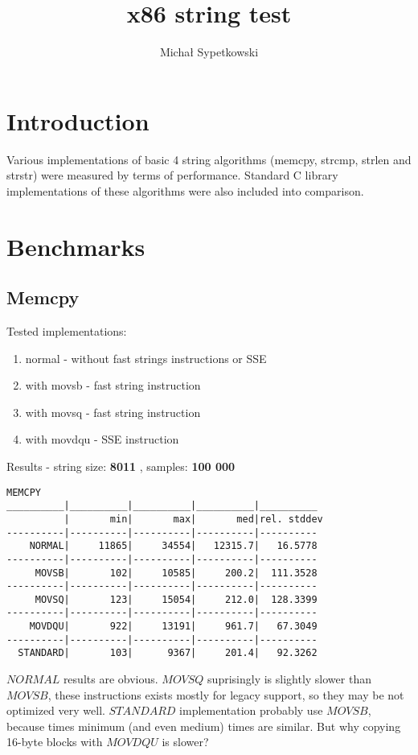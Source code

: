 \documentclass[11pt,a4paper]{article}
\title{x86 string test}
\author{Michał Sypetkowski}
\date{}
\begin{document}
\maketitle
\section{Introduction}\label{sec:intro}
Various implementations of basic 4 string algorithms (memcpy, strcmp, strlen and strstr) were measured by terms of performance.
Standard C library implementations of these algorithms were also included into comparison.

\section{Benchmarks}\label{sec:benchmarks}

\subsection{Memcpy}\label{subsec:memcpy}
    Tested implementations:
    \begin{enumerate}
        \item normal - without fast strings instructions or SSE
        \item with movsb - fast string instruction
        \item with movsq - fast string instruction
        \item with movdqu - SSE instruction
    \end{enumerate}


Results - string size: \textbf{8011} , samples: \textbf{100 000}
\begin{lstlisting}[]
MEMCPY
__________|__________|__________|__________|__________
          |       min|       max|       med|rel. stddev
----------|----------|----------|----------|----------
    NORMAL|     11865|     34554|   12315.7|   16.5778
----------|----------|----------|----------|----------
     MOVSB|       102|     10585|     200.2|  111.3528
----------|----------|----------|----------|----------
     MOVSQ|       123|     15054|     212.0|  128.3399
----------|----------|----------|----------|----------
    MOVDQU|       922|     13191|     961.7|   67.3049
----------|----------|----------|----------|----------
  STANDARD|       103|      9367|     201.4|   92.3262
\end{lstlisting}

$NORMAL$ results are obvious. $MOVSQ$ suprisingly is slightly slower than $MOVSB$, these instructions exists mostly for legacy support, so they may be not optimized very well.
$STANDARD$ implementation probably use $MOVSB$, because times minimum (and even medium) times are similar.
But why copying 16-byte blocks with $MOVDQU$ is slower?
\end{document}
